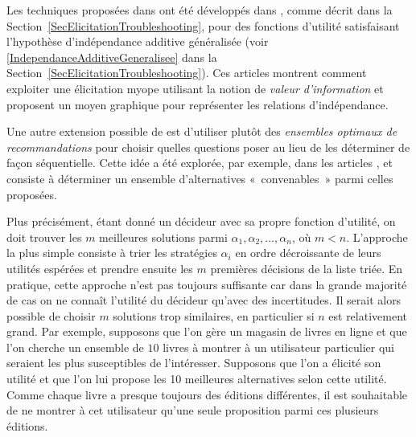 \documentclass[a4paper,11pt]{article}
\theoremstyle{plain}
\theoremstyle{definition}
\begin{document}
Les techniques proposées dans \cite{chajewska_making_2000, boutilier_pomdp_2002} ont été développés dans \cite{braziunas_local_2005, Braziunas_2008}, comme décrit dans la Section~\ref{SecElicitationTroubleshooting}, pour des fonctions d'utilité satisfaisant l'hypothèse d'indépendance additive généralisée (voir \eqref{IndependanceAdditiveGeneralisee} dans la Section~\ref{SecElicitationTroubleshooting}). Ces articles montrent comment exploiter une élicitation myope utilisant la notion de \emph{valeur d'information} et proposent un moyen graphique pour représenter les relations d'indépendance.

Une autre extension possible de \cite{chajewska_making_2000, boutilier_pomdp_2002} est d'utiliser plutôt des \emph{ensembles optimaux de recommandations} pour choisir quelles questions poser au lieu de les déterminer de façon séquentielle. Cette idée a été explorée, par exemple, dans les articles \cite{price_optimal_2005, viappiani_optimal_2005}, et consiste à déterminer un ensemble d'alternatives «~convenables~» parmi celles proposées.

Plus précisément, étant donné un décideur avec sa propre fonction d'utilité, on doit trouver les $m$ meilleures solutions parmi $\alpha_1, \alpha_2, \dotsc, \alpha_n$, où $m < n$. L'approche la plus simple consiste à trier les stratégies $\alpha_i$ en ordre décroissante de leurs utilités espérées et prendre ensuite les $m$ premières décisions de la liste triée. En pratique, cette approche n'est pas toujours suffisante \cite{price_optimal_2005} car dans la grande majorité de cas on ne connaît l'utilité du décideur qu'avec des incertitudes. Il serait alors possible de choisir $m$ solutions trop similaires, en particulier si $n$ est relativement grand. Par exemple, supposons que l'on gère un magasin de livres en ligne et que l'on cherche un ensemble de $10$ livres à montrer à un utilisateur particulier qui seraient les plus susceptibles de l'intéresser. Supposons que l'on a élicité son utilité et que l'on lui propose les 10 meilleures alternatives selon cette utilité. Comme chaque livre a presque toujours des éditions différentes, il est souhaitable de ne montrer à cet utilisateur qu'une seule proposition parmi ces plusieurs éditions.
\end{document}
